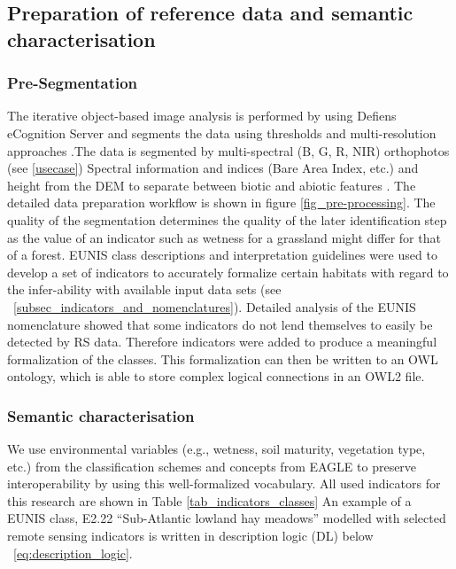 \documentclass[authoryear, review,12pt,number]{elsarticle}
\begin{document}



\label{subsec_Preparation_of_reference_data_and_semantic_characterisation}
\subsection{Preparation of reference data and semantic characterisation}

\subsubsection{Pre-Segmentation} 
\label{subsec_segmentation}
The iterative object-based image analysis is performed by \cite{Tintrup2015} 
using Defiens eCognition Server and segments the data using thresholds and 
multi-resolution approaches \citep{baatz2001ecognition}.The data is segmented 
by multi-spectral (B, G, R, NIR) orthophotos (see \ref{usecase}) 
Spectral information and indices (Bare Area Index, etc.) and 
height from the DEM to separate between biotic and abiotic features 
\citep{Tintrup2015}. The detailed %
data preparation workflow is 
shown in figure \ref{fig_pre-processing}. The quality of the segmentation
determines the quality of the later identification step as the value of an
indicator such as wetness for a grassland might differ for that of a forest.
EUNIS class descriptions and interpretation guidelines \citep{EUNISManual} were
used to develop a set of indicators to accurately formalize certain habitats
with regard to the infer-ability with available input data sets (see
~\ref{subsec_indicators_and_nomenclatures}). Detailed analysis of the EUNIS
nomenclature showed that some indicators do not lend themselves to easily be
detected by RS data. Therefore indicators were added to produce a meaningful
formalization of the classes.  This formalization can then be written to an OWL
ontology, which is able to store complex logical connections in an OWL2 file.


\subsubsection{Semantic characterisation} 
\label{subsec_segmentation}
We use environmental variables (e.g., wetness, soil maturity, vegetation type,
etc.) from the classification schemes and concepts from EAGLE to preserve
interoperability by using this well-formalized vocabulary. All used indicators
for this research are shown in Table \ref{tab_indicators_classes} An example of
a EUNIS class, E2.22 ``Sub-Atlantic lowland hay meadows'' modelled with selected
remote sensing indicators is written in description logic (DL) below
~\ref{eq:description_logic}.
\end{document}
